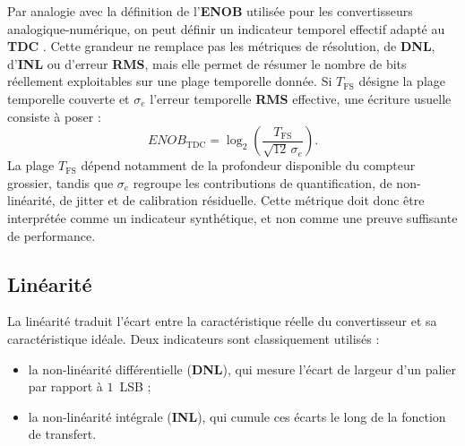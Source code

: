Par analogie avec la définition de l'\textbf{ENOB} utilisée pour les convertisseurs analogique-numérique, on peut définir un indicateur temporel effectif adapté au \textbf{TDC} \cite{ieee1241_2010}. Cette grandeur ne remplace pas les métriques de résolution, de \textbf{DNL}, d'\textbf{INL} ou d'erreur \textbf{RMS}, mais elle permet de résumer le nombre de bits réellement exploitables sur une plage temporelle donnée. Si $T_{\mathrm{FS}}$ désigne la plage temporelle couverte et $\sigma_e$ l'erreur temporelle \textbf{RMS} effective, une écriture usuelle consiste à poser :
\[
    ENOB_{\mathrm{TDC}} = \log_2\left(\frac{T_{\mathrm{FS}}}{\sqrt{12}\,\sigma_e}\right).
\]
La plage $T_{\mathrm{FS}}$ dépend notamment de la profondeur disponible du compteur grossier, tandis que $\sigma_e$ regroupe les contributions de quantification, de non-linéarité, de jitter et de calibration résiduelle. Cette métrique doit donc être interprétée comme un indicateur synthétique, et non comme une preuve suffisante de performance.

\subsection{Linéarité}

La linéarité traduit l'écart entre la caractéristique réelle du convertisseur et sa caractéristique idéale. Deux indicateurs sont classiquement utilisés \cite{annagrebah2021thesis,kalisz2004review} :
\begin{itemize}
    \item la non-linéarité différentielle (\textbf{DNL}), qui mesure l’écart de largeur d’un palier par rapport à $1$~LSB ;
    \item la non-linéarité intégrale (\textbf{INL}), qui cumule ces écarts le long de la fonction de transfert.
\end{itemize}

